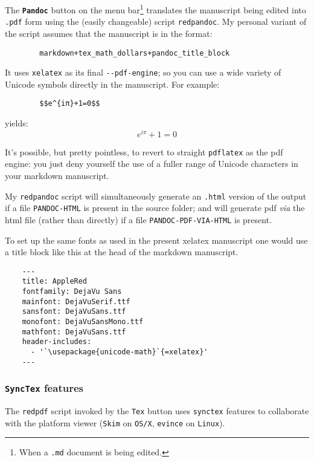 \documentclass[11pt,a4paper]{article}
\begin{document}
The \textbf{\texttt{Pandoc}} button on the menu bar\footnote{When
a \texttt{.md} document is being edited.} translates the manuscript
being edited into \texttt{.pdf} form using the (easily changeable)
script \texttt{redpandoc}.  My personal variant of the script assumes
that the manuscript is in the format:

\begin{verbatim}
        markdown+tex_math_dollars+pandoc_title_block
\end{verbatim}

It uses \texttt{xelatex} as its final \texttt{-\/-pdf-engine}; so you can
use a wide variety of Unicode symbols directly in the manuscript. For
example:

\begin{verbatim}
        $$e^{iπ}+1=0$$
\end{verbatim}

yields: \[e^{iπ}+1=0\]

It's possible, but pretty pointless, to revert to straight
\texttt{pdflatex} as the pdf engine: you just deny yourself the use
of a fuller range of Unicode characters in your markdown manuscript.

My \texttt{redpandoc} script will simultaneously generate an
\texttt{.html} version of the output if a file \texttt{PANDOC-HTML} is
present in the source folder; and will generate pdf \emph{via} the html
file (rather than directly) if a file \texttt{PANDOC-PDF-VIA-HTML} is
present.

To set up the same fonts as used in the present xelatex manuscript
one would use a title block like this at the head of the markdown
manuscript.

\begin{verbatim}
    ---
    title: AppleRed
    fontfamily: DejaVu Sans
    mainfont: DejaVuSerif.ttf
    sansfont: DejaVuSans.ttf
    monofont: DejaVuSansMono.ttf 
    mathfont: DejaVuSans.ttf
    header-includes:
      - '`\usepackage{unicode-math}`{=xelatex}'
    ---
\end{verbatim}

\hypertarget{synctex-features}{%
\subsubsection{\texorpdfstring{\texttt{SyncTex}
features}{SyncTex features}}\label{synctex-features}}

The \texttt{redpdf} script invoked by the \texttt{Tex} button uses
\texttt{synctex} features to collaborate with the platform viewer
(\texttt{Skim} on \texttt{OS/X}, \texttt{evince} on \texttt{Linux}).
\end{document}
